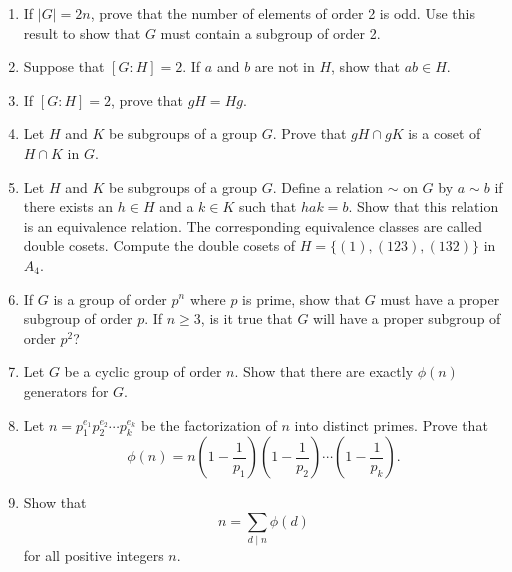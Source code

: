 {\begin{enumerate}
\item
If $|G| = 2n$, prove that the number of elements of order 2 is odd.  Use this result to show that $G$ must contain a subgroup of order 2.

\item
Suppose that $[G : H] = 2$. If $a$ and $b$ are not in $H$, show that $ab \in H$.

\item
If $[G : H] = 2$, prove that $gH = Hg$.

\item
Let $H$ and $K$ be subgroups of a group $G$.  Prove that $gH \cap gK$ is a coset of $H \cap K$ in $G$.  
 
\item
Let $H$ and $K$ be subgroups of a group $G$.  Define a relation $\sim$ on $G$ by $a \sim b$ if there exists an $h \in H$ and a $k \in K$ such that $hak = b$.  Show that this relation is an equivalence relation.  The corresponding equivalence classes are called {\bfi double cosets}.  Compute the double cosets of $H = \{ (1),(123), (132) \}$ in~$A_4$. 
 
\item
If $G$ is a group of order $p^n$ where $p$ is prime, show that $G$ must have a proper subgroup of order $p$.  If $n \geq 3$, is it true that $G$ will have a proper subgroup of order $p^2$?
 
\item
Let $G$ be a cyclic group of order $n$.  Show that there are exactly $\phi(n)$ generators for $G$.

\item
Let $n = p_1^{e_1} p_2^{e_2} \cdots p_k^{e_k}$ be the factorization of $n$ into distinct primes.  Prove that
$$
\phi(n) =  n 
\left( 1- \frac{1}{p_1} \right)
\left( 1- \frac{1}{p_2} \right)	\cdots
\left( 1- \frac{1}{p_k} \right).
$$

\item
Show that 
$$
n = \sum_{d \mid n} \phi(d)
$$
for all positive integers $n$.

\end{enumerate}
}




